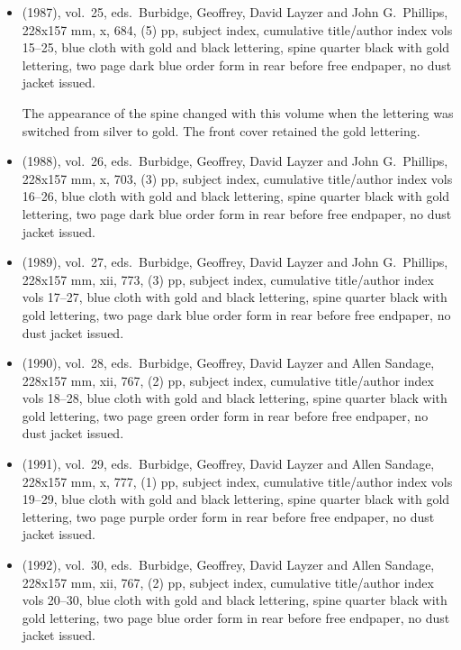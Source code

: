 \begin{itemize}
	\item (1987), vol.\ 25, eds.\ Burbidge, Geoffrey, David Layzer and John G.\ Phillips, 228x157 mm,
	x, 684, (5) pp, subject index, cumulative title/author index vols 15--25,
	blue cloth with gold and black lettering, spine quarter black with gold lettering,
	two page dark blue order form in rear before free endpaper, no dust jacket issued.
	
	The appearance of the spine changed with this volume when the lettering was switched
	from silver to gold.  The front cover retained the gold lettering. 

	\item (1988), vol.\ 26, eds.\ Burbidge, Geoffrey, David Layzer and John G.\ Phillips, 228x157 mm,
	x, 703, (3) pp, subject index, cumulative title/author index vols 16--26,
	blue cloth with gold and black lettering, spine quarter black with gold lettering,
	two page dark blue order form in rear before free endpaper, no dust jacket issued.

	\item (1989), vol.\ 27, eds.\ Burbidge, Geoffrey, David Layzer and John G.\ Phillips, 228x157 mm,
	xii, 773, (3) pp, subject index, cumulative title/author index vols 17--27,
	blue cloth with gold and black lettering, spine quarter black with gold lettering,
	two page dark blue order form in rear before free endpaper, no dust jacket issued.

	\item (1990), vol.\ 28, eds.\ Burbidge, Geoffrey, David Layzer and Allen Sandage, 228x157 mm,
	xii, 767, (2) pp, subject index, cumulative title/author index vols 18--28,
	blue cloth with gold and black lettering, spine quarter black with gold lettering,
	two page green order form in rear before free endpaper, no dust jacket issued.

	\item (1991), vol.\ 29, eds.\ Burbidge, Geoffrey, David Layzer and Allen Sandage, 228x157 mm,
	x, 777, (1) pp, subject index, cumulative title/author index vols 19--29,
	blue cloth with gold and black lettering, spine quarter black with gold lettering,
	two page purple order form in rear before free endpaper, no dust jacket issued.
	
	\item (1992), vol.\ 30, eds.\ Burbidge, Geoffrey, David Layzer and Allen Sandage, 228x157 mm,
	xii, 767, (2) pp, subject index, cumulative title/author index vols 20--30,
	blue cloth with gold and black lettering, spine quarter black with gold lettering,
	two page blue order form in rear before free endpaper, no dust jacket issued.
	

\end{itemize}

